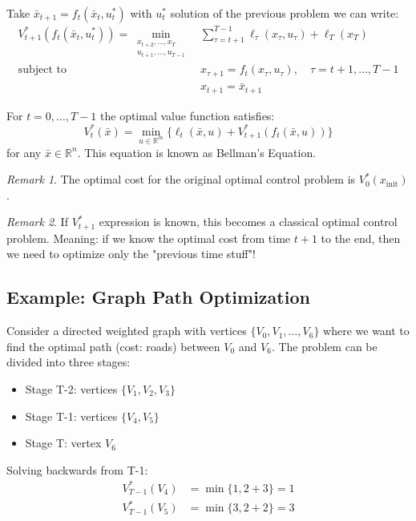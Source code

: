 \documentclass[openany]{book}
\newcommand{\R}{\mathbb{R}}               %
\theoremstyle{definition}
\theoremstyle{remark}
\newtheorem*{remark}{Remark}
\begin{document}
Take $\bar{x}_{t+1} = f_t(\bar{x}_t,u_t^*)$ with $u_t^*$ solution of the previous problem we can write:
\begin{align*}
    V_{t+1}^*(f_t(\bar{x}_t,u_t^*)) = \min_{\substack{x_{t+2},\dots,x_T \\ u_{t+1},\dots,u_{T-1}}} & \sum_{\tau=t+1}^{T-1} \ell_\tau(x_\tau,u_\tau) + \ell_T(x_T)\\
    \text{subject to } & x_{\tau+1} = f_t(x_\tau,u_\tau), \quad \tau=t+1,\dots,T-1\\
    & x_{t+1} = \bar{x}_{t+1}
\end{align*}

For $t=0,\dots,T-1$ the optimal value function satisfies:
\[
    V_t^*(\bar{x}) = \min_{u\in\R^m} \{\ell_t(\bar{x},u) + V_{t+1}^*(f_t(\bar{x},u))\}
\]
for any $\bar{x}\in\R^n$. This equation is known as Bellman's Equation.

\begin{remark}
The optimal cost for the original optimal control problem is $V_0^*(x_{\text{init}})$.
\end{remark}

\begin{remark}
If $V_{t+1}^*$ expression is known, this becomes a classical optimal control problem.
Meaning: if we know the optimal cost from time $t+1$ to the end, then we need to optimize only the "previous time stuff"!
\end{remark}

\subsection{Example: Graph Path Optimization}
Consider a directed weighted graph with vertices $\{V_0,V_1,\dots,V_6\}$ where we want to find the optimal path (cost: roads) between $V_0$ and $V_6$. The problem can be divided into three stages:
\begin{itemize}
    \item Stage T-2: vertices $\{V_1,V_2,V_3\}$
    \item Stage T-1: vertices $\{V_4,V_5\}$  
    \item Stage T: vertex $V_6$
\end{itemize}

Solving backwards from T-1:
\begin{align*}
    V_{T-1}^*(V_4) &= \min\{1,2+3\} = 1\\
    V_{T-1}^*(V_5) &= \min\{3,2+2\} = 3
\end{align*}
\end{document}
